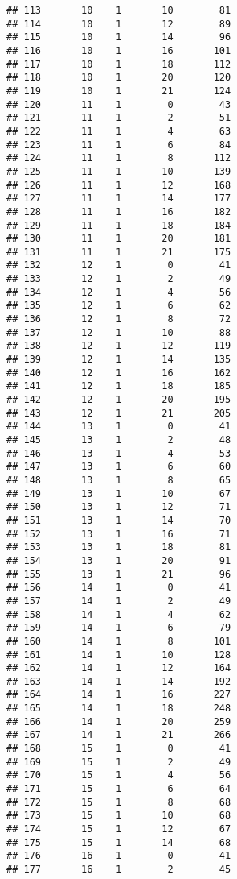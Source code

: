 \documentclass[
]{article}
\begin{document}
\begin{verbatim}
## 113       10    1       10        81
## 114       10    1       12        89
## 115       10    1       14        96
## 116       10    1       16       101
## 117       10    1       18       112
## 118       10    1       20       120
## 119       10    1       21       124
## 120       11    1        0        43
## 121       11    1        2        51
## 122       11    1        4        63
## 123       11    1        6        84
## 124       11    1        8       112
## 125       11    1       10       139
## 126       11    1       12       168
## 127       11    1       14       177
## 128       11    1       16       182
## 129       11    1       18       184
## 130       11    1       20       181
## 131       11    1       21       175
## 132       12    1        0        41
## 133       12    1        2        49
## 134       12    1        4        56
## 135       12    1        6        62
## 136       12    1        8        72
## 137       12    1       10        88
## 138       12    1       12       119
## 139       12    1       14       135
## 140       12    1       16       162
## 141       12    1       18       185
## 142       12    1       20       195
## 143       12    1       21       205
## 144       13    1        0        41
## 145       13    1        2        48
## 146       13    1        4        53
## 147       13    1        6        60
## 148       13    1        8        65
## 149       13    1       10        67
## 150       13    1       12        71
## 151       13    1       14        70
## 152       13    1       16        71
## 153       13    1       18        81
## 154       13    1       20        91
## 155       13    1       21        96
## 156       14    1        0        41
## 157       14    1        2        49
## 158       14    1        4        62
## 159       14    1        6        79
## 160       14    1        8       101
## 161       14    1       10       128
## 162       14    1       12       164
## 163       14    1       14       192
## 164       14    1       16       227
## 165       14    1       18       248
## 166       14    1       20       259
## 167       14    1       21       266
## 168       15    1        0        41
## 169       15    1        2        49
## 170       15    1        4        56
## 171       15    1        6        64
## 172       15    1        8        68
## 173       15    1       10        68
## 174       15    1       12        67
## 175       15    1       14        68
## 176       16    1        0        41
## 177       16    1        2        45

\end{verbatim}
\end{document}
